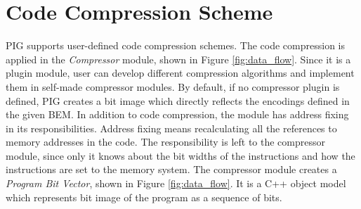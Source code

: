 \documentclass[a4paper,twoside]{tce}
\begin{document}




%


\section{Code Compression Scheme}

PIG supports user-defined code compression schemes. The code
compression is applied in the \emph{Compressor} module, shown in
Figure \ref{fig:data_flow}. Since it is a plugin module, user can
develop different compression algorithms and implement them in
self-made compressor modules. By default, if no compressor plugin is
defined, PIG creates a bit image which directly reflects the encodings
defined in the given BEM. In addition to code compression, the module
has address fixing in its responsibilities. Address fixing means
recalculating all the references to memory addresses in the code. The
responsibility is left to the compressor module, since only it
knows about the bit widths of the instructions and how the instructions
are set to the memory system. The compressor module creates a
\emph{Program Bit Vector}, shown in Figure \ref{fig:data_flow}. It is a C++ 
object model which represents bit image of the program as a sequence
of bits.
\end{document}

